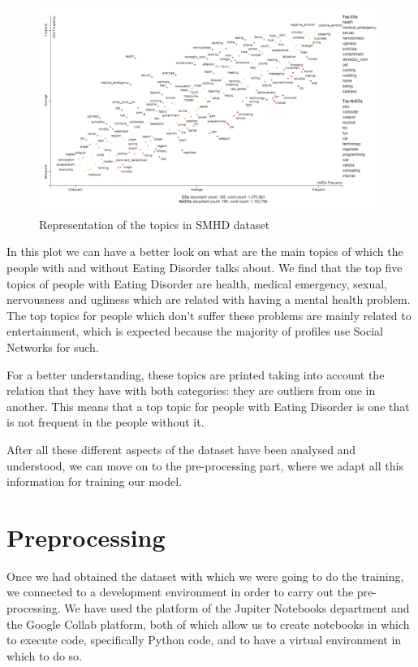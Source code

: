\begin{figure}[!htp]
    \centering
    \includegraphics[scale=0.7]{img/detection/empath_scattertext.png}
    \caption{Representation of the topics in SMHD dataset}
    \label{fig:empath-scattertext}
\end{figure}

In this plot we can have a better look on what are the main topics of which the people with and without Eating Disorder talks about. We find that the top five topics of people with Eating Disorder are health, medical emergency, sexual, nervousness and ugliness which are related with having a mental health problem. The top topics for people which don't suffer these problems are mainly related to entertainment, which is expected because the majority of profiles use Social Networks for such.

For a better understanding, these topics are printed taking into account the relation that they have with both categories: they are outliers from one in another. This means that a top topic for people with Eating Disorder is one that is not frequent in the people without it.

After all these different aspects of the dataset have been analysed and understood, we can move on to the pre-processing part, where we adapt all this information for training our model.

\section{Preprocessing}
\label{sec:preprocessing}
Once we had obtained the dataset with which we were going to do the training, we connected to a development environment in order to carry out the pre-processing. We have used the platform of the Jupiter Notebooks department and the Google Collab platform, both of which allow us to create notebooks in which to execute code, specifically Python code, and to have a virtual environment in which to do so.

